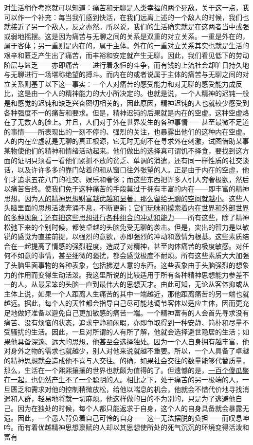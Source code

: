 \documentclass[12pt,oneside]{book}
\begin{document}
 

对生活稍作考察就可以知道：\uline{痛苦和无聊是人类幸福的两个死敌}，关于这一点，我可以作一个补充：每当我们感到快活，在我们远离上述的一个敌人的时候，我们也就接近了另一个敌人，反之亦然。所以说，我们的生活确实就是在这两者当中或强或弱地摇摆。这是因为痛苦与无聊之间的关系是双重的对立关系。一重是外在的，属于客体；另一重则是内在的，属于主体。外在的一重对立关系其实也就是生活的艰辛和匮乏产生出了痛苦，而丰裕和安定就产生无聊。因此，我们看见低下的劳动阶层与匮乏——亦即痛苦——进行着永恒的斗争，而有钱的上流社会却旷日持久地与无聊进行一场堪称绝望的搏斗。而内在的或者说属于主体的痛苦与无聊之间的对立关系则基于以下这一事实：一个人对痛苦的感受能力和对无聊的感受能力成反比，这是由一个人的精神能力的大小所决定的。也就是说，一个人精神的迟钝一般是和感觉的迟钝和缺乏兴奋密切相关的，因此原因，精神迟钝的人也就较少感受到各种强度不一的痛苦和要求。但是，精神迟钝的后果就是内在的空虚。这种空虚烙在了无数人的脸上。并且，人们对于外在世界发生的各种事情——甚至最微不足道的事情——所表现出的一刻不停的、强烈的关注，也暴露出他们的这种内在空虚。人的内在空虚就是无聊的真正根源，它无时无刻不在寻求外在刺激，试图借助某事某物使他们的精神和情绪活动起来。他们做出的选择真可谓饥不择食，要找到这方面的证明只须看一看他们紧抓不放的贫乏、单调的消遣，还有同一样性质的社交谈话，以及许许多多的靠门站着的和从窗口往外张望的人。正是由于内在的空虚，他们才追求五花八门的社交、娱乐和奢侈；而这些东西把许多人引人穷奢极欲，然后以痛苦告终。使我们免于这种痛苦的手段莫过于拥有丰富的内在——即丰富的精神思想。因为\uline{人的精神思想财富越优越和显著，那么留给无聊的空间就越小}。这些人头脑里面的思想活泼奔涌不息，不断更新；\uline{它们玩味和摸索着内在世界和外部世界的多种现象；还有把这些思想进行各种组合的冲动和能力}——所有这些，除了精神松弛下来的个别时候，都使卓越的头脑免受无聊的袭击。但是，突出的智力是以敏锐的感觉为直接前提，以强烈的意欲，亦即强烈的冲动和激情为根基。这些素质结合在一起提高了情感的强烈程度，造成了对精神，甚至肉体痛苦的极度敏感。对任何不如意的事情，甚至细微的骚扰，都会感觉极度不耐烦。所有这些素质大大加强了头脑里面事物的各种表象，包括拂逆人意的东西。这些表象由于头脑强烈的想象力的作用而变得生动活泼。我这里所说的比较适用于所有各种精神思想能力参差不一的人，从最呆笨的头脑一直到最伟大的思想天才。由此可知，无论从客体抑或从主体上说，如果一个人距离人生痛苦的其中一端越近，那他距离痛苦的另一端也就越远。据此，每个人的天性都会指导自己尽可能地调节客体以适应主体，因而更充足地做好准备以避免自己更加敏感的痛苦一端。一个精神富有的人会首先寻求没有痛苦、没有烦恼的状态，追求宁静和闲暇，亦即争取得到一种安静、简朴和尽量不受骚扰的生活。因此，一旦对所谓的人有所了解，他就会选择避世隐居的生活；如果他具备深邃、远大的思想，他甚至会选择独处。因为一个人自身拥有越丰富，他对身外之物的需求也就越少，别人对他来说就越不重要。所以，一个人具备了卓越的精神思想就会造成他不喜与人交往。的确，如果社会交往的数量能够代替质量，那么，生活在一个熙熙攘攘的世界也就颇为值得的了。但遗憾的是，\uline{一百个傻瓜聚在一起，也仍然产生不了一个聪明的人}。相比之下，处于痛苦的另一极端的人，一旦匮乏和需求对他的控制稍微放松，给他以喘息的机会，他就会不惜代价地寻找消遣和人群，轻易地将就一切麻烦。他这样做的目的不为别的，只是为了逃避他自己。因为在独处的时候，每个人都只能返求于自身，这个人的自身具备就会暴露无遗。因此，一个愚人背负着自己可怜的自身——这一无法摆脱的负担——而叹息呻吟。而有着优越精神思想禀赋的人却以其思想使所处的死气沉沉的环境变得活泼和富有
\end{document}
